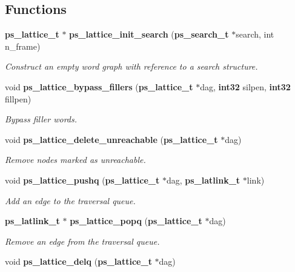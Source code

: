 \subsection*{\-Functions}
\begin{DoxyCompactItemize}
\item 
{\bf ps\-\_\-lattice\-\_\-t} $\ast$ {\bf ps\-\_\-lattice\-\_\-init\-\_\-search} ({\bf ps\-\_\-search\-\_\-t} $\ast$search, int n\-\_\-frame)\label{ps__lattice__internal_8h_a606f6ee0fd569dd5829d7f84ae7e61bd}

\begin{DoxyCompactList}\small\item\em \-Construct an empty word graph with reference to a search structure. \end{DoxyCompactList}\item 
void {\bf ps\-\_\-lattice\-\_\-bypass\-\_\-fillers} ({\bf ps\-\_\-lattice\-\_\-t} $\ast$dag, {\bf int32} silpen, {\bf int32} fillpen)\label{ps__lattice__internal_8h_a9b40adaa059978fe33959d59da1b6919}

\begin{DoxyCompactList}\small\item\em \-Bypass filler words. \end{DoxyCompactList}\item 
void {\bf ps\-\_\-lattice\-\_\-delete\-\_\-unreachable} ({\bf ps\-\_\-lattice\-\_\-t} $\ast$dag)\label{ps__lattice__internal_8h_a6da4e36322aaab4d2ebe812bee9a4439}

\begin{DoxyCompactList}\small\item\em \-Remove nodes marked as unreachable. \end{DoxyCompactList}\item 
void {\bf ps\-\_\-lattice\-\_\-pushq} ({\bf ps\-\_\-lattice\-\_\-t} $\ast$dag, {\bf ps\-\_\-latlink\-\_\-t} $\ast$link)\label{ps__lattice__internal_8h_a04896ebe0e2592bc7950d413b5d5c52e}

\begin{DoxyCompactList}\small\item\em \-Add an edge to the traversal queue. \end{DoxyCompactList}\item 
{\bf ps\-\_\-latlink\-\_\-t} $\ast$ {\bf ps\-\_\-lattice\-\_\-popq} ({\bf ps\-\_\-lattice\-\_\-t} $\ast$dag)\label{ps__lattice__internal_8h_a481c4d941368597e11b0af4709bd03b0}

\begin{DoxyCompactList}\small\item\em \-Remove an edge from the traversal queue. \end{DoxyCompactList}\item 
void {\bf ps\-\_\-lattice\-\_\-delq} ({\bf ps\-\_\-lattice\-\_\-t} $\ast$dag)\label{ps__lattice__internal_8h_ad128ca75e8bc7ca4ba41094fb5b68ee9}


\end{DoxyCompactItemize}
